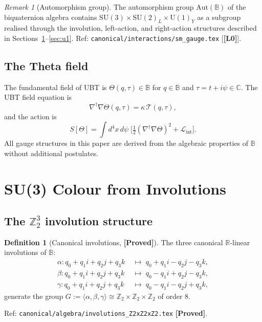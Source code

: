 \documentclass[12pt,a4paper]{article}
\theoremstyle{definition}
\newtheorem{definition}[theorem]{Definition}
\theoremstyle{remark}
\newtheorem{remark}[theorem]{Remark}
\newcommand{\PROVED}{\textbf{[Proved]}}
\newcommand{\SU}[1]{\mathrm{SU}(#1)}
\newcommand{\UU}[1]{\mathrm{U}(#1)}
\newcommand{\Lzero}{\textbf{[L0]}}
\begin{document}
\begin{remark}[Automorphism group]
The automorphism group $\mathrm{Aut}(\mathbb{B})$ of the biquaternion algebra
contains $\SU{3}\times\SU{2}_L\times\UU{1}_Y$ as a subgroup realised
through the involution, left-action, and right-action structures
described in Sections~\ref{sec:su3}--\ref{sec:u1}.
Ref: \texttt{canonical/interactions/sm\_gauge.tex} [\Lzero].
\end{remark}

\subsection{The Theta field}

The fundamental field of UBT is $\Theta(q,\tau)\in\mathbb{B}$
for $q\in\mathbb{B}$ and $\tau = t + i\psi\in\mathbb{C}$.
The UBT field equation is
\[
\nabla^\dagger\nabla\Theta(q,\tau) = \kappa\,\mathcal{T}(q,\tau),
\]
and the action is
\[
S[\Theta] = \int d^4x\,d\psi\;
\bigl[\tfrac{1}{2}(\nabla^\dagger\nabla\Theta)^2 + \mathcal{L}_{\mathrm{int}}\bigr].
\]
All gauge structures in this paper are derived from the algebraic properties
of $\mathbb{B}$ without additional postulates.

\section{SU(3) Colour from Involutions}
\label{sec:su3}

\subsection{The $\mathbb{Z}_2^3$ involution structure}

\begin{definition}[Canonical involutions, \PROVED]
\label{def:involutions}
The three canonical $\mathbb{R}$-linear involutions of $\mathbb{B}$:
\begin{align*}
\alpha : q_0 + q_1 i + q_2 j + q_3 k &\;\mapsto\; q_0 + q_1 i - q_2 j - q_3 k, \\
\beta  : q_0 + q_1 i + q_2 j + q_3 k &\;\mapsto\; q_0 - q_1 i + q_2 j - q_3 k, \\
\gamma : q_0 + q_1 i + q_2 j + q_3 k &\;\mapsto\; q_0 - q_1 i - q_2 j + q_3 k,
\end{align*}
generate the group
$G := \langle\alpha,\beta,\gamma\rangle \cong \mathbb{Z}_2\times\mathbb{Z}_2\times\mathbb{Z}_2$
of order 8.

Ref: \texttt{canonical/algebra/involutions\_Z2xZ2xZ2.tex} \PROVED.
\end{definition}
\end{document}
